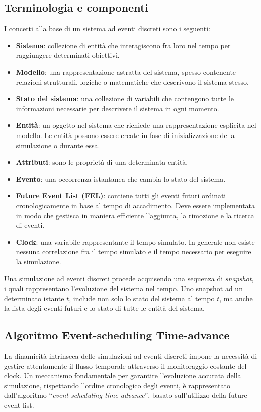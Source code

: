 \documentclass[12pt,a4paper,openright,twoside]{book}
\begin{document}
\subsection{Terminologia e componenti}
I concetti alla base di un sistema ad eventi discreti sono i seguenti: 
\begin{itemize}
    \item \textbf{Sistema}: collezione di entità che interagiscono fra loro nel tempo per raggiungere determinati obiettivi.
    \item \textbf{Modello}: una rappresentazione astratta del sistema, spesso contenente relazioni strutturali, logiche o matematiche che descrivono il sistema stesso.
    \item \textbf{Stato del sistema}: una collezione di variabili che contengono tutte le informazioni necessarie per descrivere il sistema in ogni momento.
    \item \textbf{Entità}: un oggetto nel sistema che richiede una rappresentazione esplicita nel modello. Le entità possono essere create in fase di inizializzazione della simulazione o durante essa. 
    \item \textbf{Attributi}: sono le proprietà di una determinata entità.
    \item \textbf{Evento}: una occorrenza istantanea che cambia lo stato del sistema. 
    \item \textbf{Future Event List (FEL)}: contiene tutti gli eventi futuri ordinati cronologicamente in base al tempo di accadimento. Deve essere implementata in modo che gestisca in maniera efficiente l'aggiunta, la rimozione e la ricerca di eventi. 
    \item \textbf{Clock}: una variabile rappresentante il tempo simulato. In generale non esiste nessuna correlazione fra il tempo simulato e il tempo necessario per eseguire la simulazione. 
\end{itemize}
Una simulazione ad eventi discreti procede acquisendo una sequenza di \textit{snapshot}, i quali rappresentano l'evoluzione del sistema nel tempo. Uno snapshot ad un determinato istante $t$, include non solo lo stato del sistema al tempo $t$, ma anche la lista degli eventi futuri e lo stato di tutte le entità del sistema.

\subsection{Algoritmo Event-scheduling Time-advance}
\label{sec:time-advance-algorithm}
La dinamicità intrinseca delle simulazioni ad eventi discreti impone la necessità di gestire attentamente il flusso temporale attraverso il monitoraggio costante del clock. 
Un meccanismo fondamentale per garantire l'evoluzione accurata della simulazione, rispettando l'ordine cronologico degli eventi, è rappresentato dall'algoritmo ``\textit{event-scheduling time-advance}'', basato sull'utilizzo della future event list.
\end{document}
